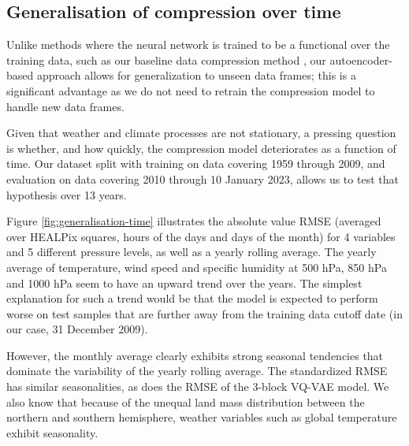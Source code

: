 \documentclass[11pt, a4paper, logo, copyright, numbering]{googledeepmind}
\begin{document}
\subsection{Generalisation of compression over time}
\label{sx:discuss:generalisation}

Unlike methods where the neural network is trained to be a functional over the training data, such as our baseline data compression method \citep{huang2022compressing}, our autoencoder-based approach allows for generalization to unseen data frames; this is a significant advantage as we do not need to retrain the compression model to handle new data frames.

Given that weather and climate processes are not stationary, a pressing question is whether, and how quickly, the compression model deteriorates as a function of time. Our dataset split with training on data covering 1959 through 2009, and evaluation on data covering 2010 through 10 January 2023, allows us to test that hypothesis over 13 years. 

Figure \ref{fig:generalisation-time} illustrates the absolute value RMSE (averaged over HEALPix squares, hours of the days and days of the month) for 4 variables and 5 different pressure levels, as well as a yearly rolling average. The yearly average of temperature, wind speed and specific humidity at 500 hPa, 850 hPa and 1000 hPa seem to have an upward trend over the years. The simplest explanation for such a trend would be that the model is expected to perform worse on test samples that are further away from the training data cutoff date (in our case, 31 December 2009).

However, the monthly average clearly exhibits strong seasonal tendencies that dominate the variability of the yearly rolling average. The standardized RMSE has similar seasonalities, as does the RMSE of the 3-block VQ-VAE model. We also know that because of the unequal land mass distribution between the northern and southern hemisphere, weather variables such as global temperature exhibit seasonality.
\end{document}
